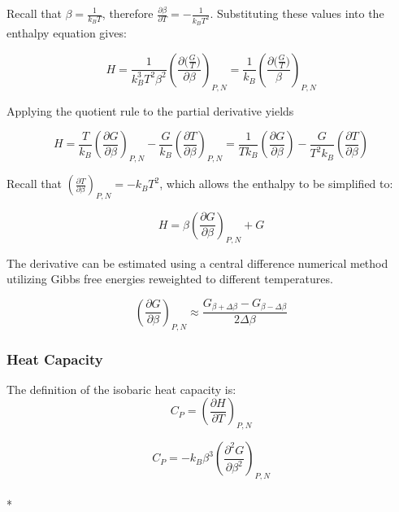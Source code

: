 \documentclass[a4paper,12pt]{article}
\begin{document}
\noindent Recall that $\beta = \frac{1}{k_B T}$, therefore $\frac{\partial \beta}{\partial T} = - \frac{1}{k_B T^2}$. Substituting these values into the enthalpy equation gives:



\begin{equation}H = \frac{1}{k_B^3 T^2 \beta^2} \left(\frac{\partial \big(\frac{G}{T}\big)}{\partial \beta}\right)_{P,N} = \frac{1}{k_B} \left(\frac{\partial \big(\frac{G}{T}\big)}{\beta}\right)_{P,N}\end{equation}


\noindent Applying the quotient rule to the partial derivative yields


\begin{equation}H = \frac{T}{k_B} \left(\frac{\partial G}{\partial \beta}\right)_{P, N} - \frac{G}{k_B}\left(\frac{\partial T}{\partial \beta}\right)_{P, N} = \frac{1}{T k_B} \left(\frac{\partial G}{\partial \beta}\right) - \frac{G}{T^2 k_B} \left(\frac{\partial T}{\partial \beta}\right)\end{equation}


\noindent Recall that $\left(\frac{\partial T}{\partial \beta}\right)_{P, N} = -k_B T^2$, which allows the enthalpy to be simplified to:


\begin{equation} H = \beta \left(\frac{\partial G}{\partial \beta}\right)_{P, N} + G\end{equation}


\noindent The derivative can be estimated using a central difference numerical method utilizing Gibbs free energies reweighted to different temperatures.

\begin{equation} \left( \frac{\partial G}{\partial \beta} \right)_{P,N} \approx \frac{G_{\beta + \Delta \beta} - G_{\beta -\Delta \beta}}{2\Delta \beta} \end{equation}

\subsubsection{Heat Capacity}
\noindent The definition of the isobaric heat capacity is:
\begin{equation}C_P =\left( \frac{\partial H}{\partial T}\right)_{P,N}\end{equation}

\begin{equation}C_P =  -k_B \beta^3 \left(\frac{\partial^2 G}{\partial \beta^2}\right)_{P,N}\end{equation}\\*
\end{document}
